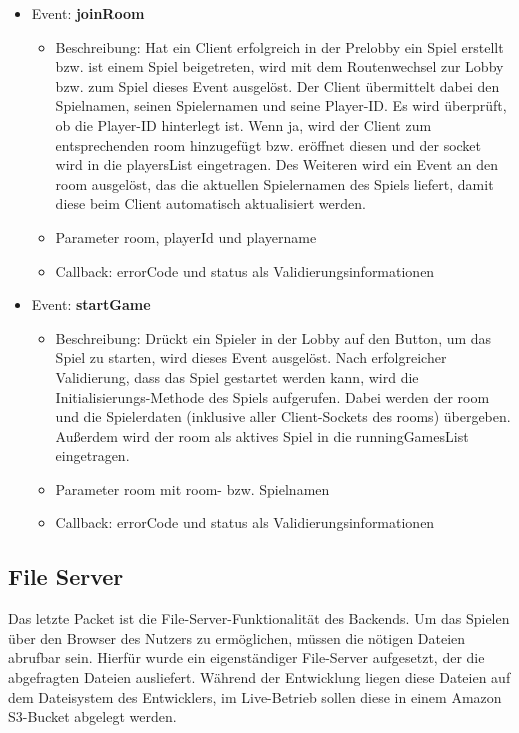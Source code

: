 \documentclass[conference]{IEEEtran}
\begin{document}
\begin{itemize}
\item Event: \textbf{joinRoom}
\begin{itemize}
\item Beschreibung: Hat ein Client erfolgreich in der Prelobby ein Spiel erstellt bzw. ist einem Spiel beigetreten, wird mit dem Routenwechsel zur Lobby bzw. zum Spiel dieses Event ausgelöst.
Der Client übermittelt dabei den Spielnamen, seinen Spielernamen und seine Player-ID. Es wird überprüft, ob die Player-ID hinterlegt ist. Wenn ja, wird der Client zum entsprechenden room hinzugefügt bzw. eröffnet diesen und der socket wird in die playersList eingetragen. Des Weiteren wird ein Event an den room ausgelöst, das die aktuellen Spielernamen des Spiels liefert, damit diese beim Client automatisch aktualisiert werden.
\item Parameter \glqq room\grqq{}, \glqq playerId\grqq{} und \glqq playername\grqq{} 
\item Callback: \glqq errorCode\grqq{} und \glqq status\grqq{} als Validierungsinformationen
\end{itemize}

\item Event: \textbf{startGame}
\begin{itemize}
\item Beschreibung: Drückt ein Spieler in der Lobby auf den Button, um das Spiel zu starten, wird dieses Event ausgelöst. Nach erfolgreicher Validierung, dass das Spiel gestartet werden kann, wird die Initialisierungs-Methode des Spiels aufgerufen. Dabei werden der room und die Spielerdaten (inklusive aller Client-Sockets des rooms) übergeben.
Außerdem wird der room als aktives Spiel in die runningGamesList eingetragen.
\item Parameter \glqq room\grqq{} mit room- bzw. Spielnamen 
\item Callback: \glqq errorCode\grqq{} und \glqq status\grqq{} als Validierungsinformationen
\end{itemize}

\end{itemize}


\subsection{File Server}
Das letzte Packet ist die File-Server-Funktionalität des Backends. Um das Spielen über den Browser des Nutzers zu ermöglichen, müssen die nötigen Dateien abrufbar sein. Hierfür wurde ein eigenständiger File-Server aufgesetzt, der die abgefragten Dateien ausliefert. Während der Entwicklung liegen diese Dateien auf dem Dateisystem des Entwicklers, im Live-Betrieb sollen diese in einem Amazon S3-Bucket abgelegt werden.
\end{document}

